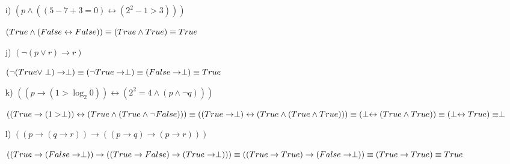 \documentclass[10pt,a4paper]{article}
\begin{document}
\begin{enumerate}
\item[i)] $(p \wedge ((5 - 7 + 3 = 0) \leftrightarrow (2^{2} - 1 > 3)))$

$(True \wedge (False \leftrightarrow False))\equiv \\
(True \wedge True)\equiv True$

\item[j)]$(\neg(p \vee r) \rightarrow r)$

$(\neg(True \vee \perp) \rightarrow \perp) \equiv \\
(\neg True \rightarrow \perp) \equiv \\
(False \rightarrow \perp)\equiv True$

\item[k)]$((p \rightarrow (1 > \log_{2} 0)) \leftrightarrow (2^{2} = 4 \wedge (p \wedge \neg q)))$

$((True \rightarrow (1 > \perp)) \leftrightarrow (True \wedge (True \wedge \neg False)))\equiv \\
((True \rightarrow \perp) \leftrightarrow (True \wedge (True \wedge True)))\equiv \\
(\perp \leftrightarrow (True \wedge True))\equiv \\
(\perp \leftrightarrow True)\equiv \perp$

\item[l)]$((p \rightarrow (q \rightarrow r)) \rightarrow ((p \rightarrow q) \rightarrow (p \rightarrow r)))$

$((True \rightarrow (False \rightarrow \perp)) \rightarrow ((True \rightarrow False) \rightarrow (True \rightarrow \perp)))\equiv \\
((True \rightarrow True) \rightarrow (False \rightarrow \perp))\equiv \\
(True \rightarrow True)\equiv True$

\end{enumerate}
\end{document}

